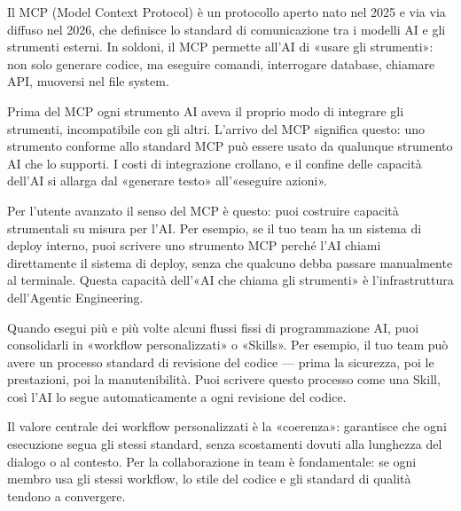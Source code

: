


Il MCP (Model Context Protocol) è un protocollo aperto nato nel 2025 e via via diffuso nel 2026, che definisce lo standard di comunicazione tra i modelli AI e gli strumenti esterni. In soldoni, il MCP permette all'AI di «usare gli strumenti»: non solo generare codice, ma eseguire comandi, interrogare database, chiamare API, muoversi nel file system.

Prima del MCP ogni strumento AI aveva il proprio modo di integrare gli strumenti, incompatibile con gli altri. L'arrivo del MCP significa questo: uno strumento conforme allo standard MCP può essere usato da qualunque strumento AI che lo supporti. I costi di integrazione crollano, e il confine delle capacità dell'AI si allarga dal «generare testo» all'«eseguire azioni».

Per l'utente avanzato il senso del MCP è questo: puoi costruire capacità strumentali su misura per l'AI. Per esempio, se il tuo team ha un sistema di deploy interno, puoi scrivere uno strumento MCP perché l'AI chiami direttamente il sistema di deploy, senza che qualcuno debba passare manualmente al terminale. Questa capacità dell'«AI che chiama gli strumenti» è l'infrastruttura dell'Agentic Engineering.


Quando esegui più e più volte alcuni flussi fissi di programmazione AI, puoi consolidarli in «workflow personalizzati» o «Skills». Per esempio, il tuo team può avere un processo standard di revisione del codice — prima la sicurezza, poi le prestazioni, poi la manutenibilità. Puoi scrivere questo processo come una Skill, così l'AI lo segue automaticamente a ogni revisione del codice.

Il valore centrale dei workflow personalizzati è la «coerenza»: garantisce che ogni esecuzione segua gli stessi standard, senza scostamenti dovuti alla lunghezza del dialogo o al contesto. Per la collaborazione in team è fondamentale: se ogni membro usa gli stessi workflow, lo stile del codice e gli standard di qualità tendono a convergere.

